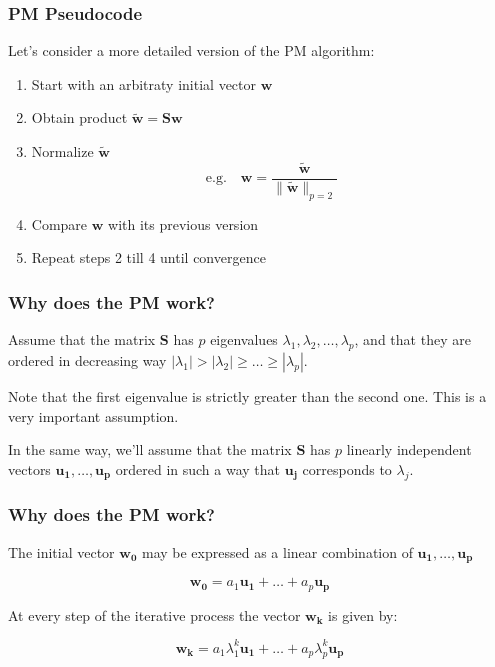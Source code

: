 \documentclass[12pt]{beamer}\usepackage[]{graphicx}\usepackage[]{color}
\begin{document}

\begin{frame}
\frametitle{PM Pseudocode}

Let's consider a more detailed version of the PM algorithm:
\begin{enumerate}
  \item Start with an arbitraty initial vector $\mathbf{w}$
  \item Obtain product $\mathbf{\tilde{w} = S w}$
  \item Normalize $\mathbf{\tilde{w}}$
  $$
  \text{e.g.} \quad \mathbf{w} = \frac{\mathbf{\tilde{w}}}{\| \mathbf{\tilde{w}} \|_{p=2}}
  $$
  \item Compare $\mathbf{w}$ with its previous version
  \item Repeat steps 2 till 4 until convergence
\end{enumerate}

\end{frame}


\begin{frame}
\frametitle{Why does the PM work?}

Assume that the matrix $\mathbf{S}$ has $p$ eigenvalues 
$\lambda_1, \lambda_2, \dots, \lambda_p$, and that they are ordered in 
decreasing way $|\lambda_1| > |\lambda_2| \geq \dots \geq |\lambda_p|$.

\bigskip
Note that the first eigenvalue is strictly greater than the second one. This is 
a very important assumption.

\bigskip
In the same way, we'll assume that the matrix $\mathbf{S}$ has $p$ linearly 
independent vectors $\mathbf{u_1}, \dots, \mathbf{u_p}$ ordered in such a way 
that $\mathbf{u_j}$ corresponds to $\lambda_j$. 

\end{frame}


\begin{frame}
\frametitle{Why does the PM work?}

The initial vector $\mathbf{w_0}$ may be expressed as a linear combination of 
$\mathbf{u_1}, \dots, \mathbf{u_p}$

$$
\mathbf{w_0} = a_1 \mathbf{u_1} + \dots + a_p \mathbf{u_p}
$$

At every step of the iterative process the vector $\mathbf{w_k}$ is given by:

$$
\mathbf{w_k} = a_1 \lambda_{1}^k \mathbf{u_1} + \dots + a_p \lambda_{p}^k \mathbf{u_p}
$$

\end{frame}
\end{document}
